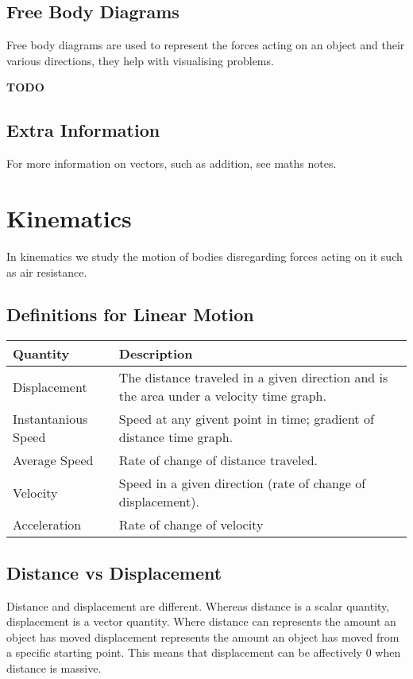 \documentclass{article}
\begin{document}
\subsection{Free Body Diagrams}
Free body diagrams are used to represent the forces acting on an object and their various directions,
they help with visualising problems.

\textbf{TODO}

\subsection{Extra Information}
For more information on vectors, such as addition, see maths notes.

\break

\section{Kinematics}
In kinematics we study the motion of bodies disregarding forces acting on it such as
air resistance.

\subsection{Definitions for Linear Motion}

\begin{center}
	\begin{tabular}{|l|l|}
		\hline
		\textbf{Quantity} & \textbf{Description} \\ \hline
		Displacement      & The distance traveled in a given direction and is the area under a velocity time graph. \\
		Instantanious Speed & Speed at any givent point in time; gradient of distance time graph. \\
		Average Speed & Rate of change of distance traveled. \\
		Velocity & Speed in a given direction (rate of change of displacement). \\
        Acceleration & Rate of change of velocity \\
		\hline
	\end{tabular}
\end{center}

\subsection{Distance vs Displacement}
Distance and displacement are different. Whereas distance is a scalar quantity, displacement is a vector quantity. Where
distance can represents the amount an object has moved displacement represents the amount an object has moved from a specific
starting point. This means that displacement can be affectively $0$ when distance is massive.
\end{document}
